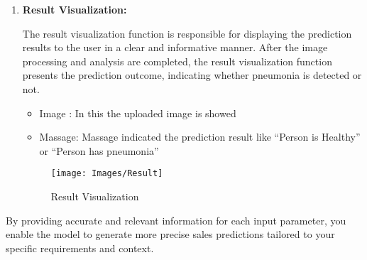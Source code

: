 \begin{enumerate}
	
	\item \textbf{Result Visualization:} 
	
	The result visualization function is responsible for displaying the prediction results to the user in a clear and informative manner. After the image processing and analysis are completed, the result visualization function presents the prediction outcome, indicating whether pneumonia is detected or not.
	
	\begin{itemize}
		\item Image : In this the uploaded image is showed
		\item	Massage: Massage indicated the prediction result like “Person is Healthy” or “Person has pneumonia”	
	\end{itemize}
	
	 \begin{figure}[h!]
		\centering
		\texttt{[image: Images/Result]}
		\caption{ Result Visualization }
	\end{figure}
	
	
	
	
\end{enumerate}

By providing accurate and relevant information for each input parameter, you enable the model to generate more precise sales predictions tailored to your specific requirements and context.
